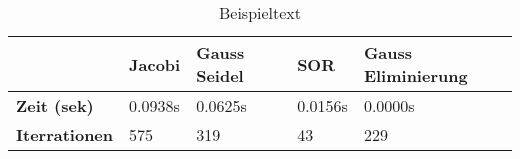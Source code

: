 \begin{table}[h!]
\centering
\caption{Beispieltext}
\label{example}
\begin{tabular}{lllll}
\toprule
{} &   Jacobi & Gauss Seidel &      SOR & Gauss Eliminierung \\
\midrule
\textbf{Zeit (sek)  } &  0.0938s &      0.0625s &  0.0156s &            0.0000s \\
\textbf{Iterrationen} &      575 &          319 &       43 &                229 \\
\bottomrule
\end{tabular}
\end{table}
